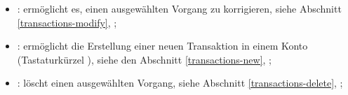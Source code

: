 \vspace{3mm}
\noindent
\begin{minipage}{.7\linewidth}
	\begin{itemize}[rightmargin=.6cm]
		\item {}: ermöglicht es, einen ausgewählten Vorgang zu korrigieren, siehe Abschnitt \vref{transactions-modify}, ;%
		\item {}: ermöglicht die Erstellung einer neuen Transaktion in einem Konto (Tastaturkürzel ), siehe den Abschnitt \vref{transactions-new}, ;%
		\item {}: löscht einen ausgewählten Vorgang, siehe Abschnitt \vref{transactions-delete}, ;%
	\end{itemize}
\end{minipage}
\hspace{10pt}	

